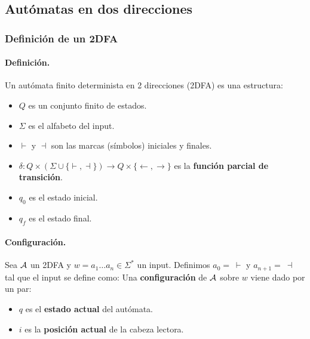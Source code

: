 \subsection{Autómatas en dos direcciones}

\subsubsection{Definición de un 2DFA}


\paragraph{Definición.} Un autómata finito determinista en 2 direcciones (2DFA) es una estructura:
\begin{itemize}
    \item $Q$ es un conjunto finito de estados.
    \item $\Sigma$ es el alfabeto del input.
    \item $\vdash$ y $\dashv$ son las marcas (símbolos) iniciales y finales.
    \item $\delta: Q \times(\Sigma \cup\{\vdash, \dashv\}) \rightarrow Q \times\{\leftarrow, \rightarrow\}$ es la \textbf{función parcial de transición}.
    \item $q_0$ es el estado inicial.
    \item $q_f$ es el estado final.
\end{itemize}


\paragraph{Configuración.} Sea $\mathcal{A}$ un 2DFA y $w = a_1 \ldots a_n \in \Sigma^*$ un input. Definimos $a_0 =\ \vdash$ y $a_{n+1} =\ \dashv$ tal que el input se define como:
Una \textbf{configuración} de $\mathcal{A}$ sobre $w$ viene dado por un par:
\begin{itemize}
    \item $q$ es el \textbf{estado actual} del autómata.
    \item $i$ es la \textbf{posición actual} de la cabeza lectora.
\end{itemize}

